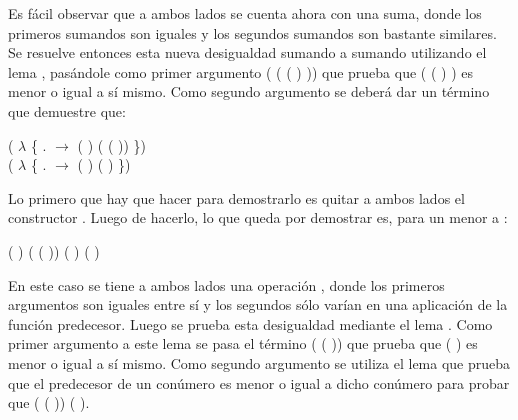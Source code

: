 \begin{AgdaAlign}
Es fácil observar que a ambos lados se cuenta ahora con una suma, donde los primeros sumandos son iguales y los segundos sumandos son bastante similares. Se resuelve entonces esta nueva desigualdad sumando a sumando utilizando el lema , pasándole como primer argumento ( ( ( ) )) que prueba que ( ( ) ) es menor o igual a sí mismo. Como segundo argumento se deberá dar un término que demuestre que: 
\begin{center}
\AgdaFunction{[}  \AgdaFunction{]} ( $\lambda$ \{ . $\rightarrow$  ( ) ( ( )) \}) \AgdaFunction{$\leq$} \\ ( $\lambda$ \{ . $\rightarrow$  ( ) ( ) \})
\end{center}

Lo primero que hay que hacer para demostrarlo es quitar a ambos lados el constructor . Luego de hacerlo, lo que queda por demostrar es, para un  menor a :
\begin{center}
\AgdaFunction{[}  \AgdaFunction{]}  ( ) ( ( )) \AgdaFunction{$\leq$}  ( ) ( )
\end{center} 

En este caso se tiene a ambos lados una operación , donde los primeros argumentos son iguales entre sí y los segundos sólo varían en una aplicación de la función predecesor. Luego se prueba esta desigualdad mediante el lema . Como primer argumento a este lema se pasa el término ( ( )) que prueba que ( ) es menor o igual a sí mismo. Como segundo argumento se utiliza el lema  que prueba que el predecesor de un conúmero es menor o igual a dicho conúmero para probar que \AgdaFunction{[}  \AgdaFunction{]} ( ( )) \AgdaFunction{$\leq$} ( ).


\end{AgdaAlign}

